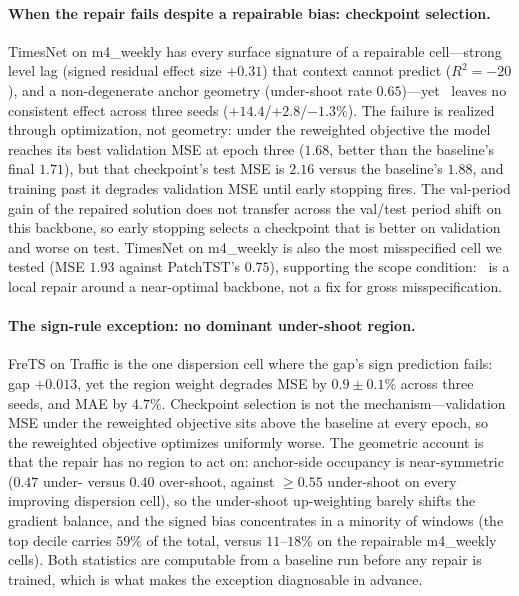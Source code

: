 \paragraph{When the repair fails despite a repairable bias: checkpoint selection.}
TimesNet on m4\_weekly has every surface signature of a repairable cell---strong level lag (signed residual effect size $+0.31$) that context cannot predict ($R^2 = -20$), and a non-degenerate anchor geometry (under-shoot rate $0.65$)---yet \rfc~leaves no consistent effect across three seeds ($+14.4$/$+2.8$/$-1.3\%$). The failure is realized through optimization, not geometry: under the reweighted objective the model reaches its best validation MSE at epoch three ($1.68$, better than the baseline's final $1.71$), but that checkpoint's test MSE is $2.16$ versus the baseline's $1.88$, and training past it degrades validation MSE until early stopping fires. The val-period gain of the repaired solution does not transfer across the val/test period shift on this backbone, so early stopping selects a checkpoint that is better on validation and worse on test. TimesNet on m4\_weekly is also the most misspecified cell we tested (MSE $1.93$ against PatchTST's $0.75$), supporting the scope condition: \rfc~is a local repair around a near-optimal backbone, not a fix for gross misspecification.

\paragraph{The sign-rule exception: no dominant under-shoot region.}
FreTS on Traffic is the one dispersion cell where the gap's sign prediction fails: gap $+0.013$, yet the region weight degrades MSE by $0.9 \pm 0.1\%$ across three seeds, and MAE by $4.7\%$. Checkpoint selection is not the mechanism---validation MSE under the reweighted objective sits above the baseline at every epoch, so the reweighted objective optimizes uniformly worse. The geometric account is that the repair has no region to act on: anchor-side occupancy is near-symmetric ($0.47$ under- versus $0.40$ over-shoot, against $\ge 0.55$ under-shoot on every improving dispersion cell), so the under-shoot up-weighting barely shifts the gradient balance, and the signed bias concentrates in a minority of windows (the top decile carries $59\%$ of the total, versus $11$--$18\%$ on the repairable m4\_weekly cells). Both statistics are computable from a baseline run before any repair is trained, which is what makes the exception diagnosable in advance.

